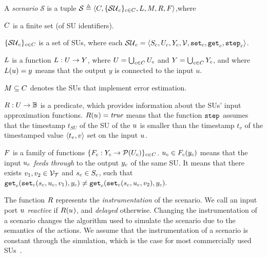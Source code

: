 \begin{definition}[Scenario]\label{def:cosim_scenario}
  A \emph{scenario} $\mathcal{S}$ is a tuple $\mathcal{S} \triangleq  \left\langle C, \{\mathcal{SU}_c\}_{c \in C}, L, M, R, F \right\rangle $,where 
  \begin{compactitem}
    \item $C$ is a finite set (of SU identifiers). 
    \item $\{\mathcal{SU}_c\}_{c \in C}$ is a set of SUs, where each $\mathcal{SU}_c =  \left\langle S_{c}, U_{c}, Y_{c}, \mathcal{V}, \mathtt{set}_{c}, \mathtt{get}_{c}, \mathtt{step}_{c} \right\rangle $.
    \item
    $L$ is a function $L : U \to Y$, where $U = \bigcup_{c \in C} U_{c}$ and $Y = \bigcup_{c \in C} Y_{c}$, and where 
    $L(u)=y$ means that the output $y$ is connected to the input $u$.   
    \item $M \subseteq C$ denotes the SUs that implement error estimation. 
    \item
    $R : U \to \mathbb{B}$ is a predicate, which provides information about the SUs' input approximation functions.
    $R(u_{}) = \mathit{true}$ means that the function $\mathtt{step}_{}$ assumes that the timestamp $t_{SU}$ of the SU of the $u_{}$ is smaller than the timestamp $t_v$ of the timestamped value $ \left\langle t_v,v \right\rangle $ set on the input $u_{}$.
    \item $F$ is a family of functions $\{F_{c} : Y_{c} \to \mathcal{P}(U_{c})\}_{c \in C}$.
    $u_{c} \in F_{c}(y_{c})$ means that the input $u_{c}$ \emph{feeds through} to the output $y_{c}$ of the same SU.
    It means that there exists $v_1, v_2 \in \mathcal{V_{T}}$ and $s_{c} \in S_{c}$, such that
    $\mathtt{get}_{c} (\mathtt{set}_{c}(s_{c}, u_{c}, v_1), y_{c}) \neq \mathtt{get}_{c} (\mathtt{set}_{c}(s_{c}, u_{c}, v_2), y_{c}).$
  \end{compactitem}
\end{definition}

The function $R$ represents the \emph{instrumentation} of the scenario.
We call an input port $u_{}$ \emph{reactive} if $R(u_{})$, and \emph{delayed} otherwise. 
Changing the instrumentation of a scenario changes the algorithm used to simulate the scenario due to the semantics of the actions.
We assume that the instrumentation of a scenario is constant through the simulation, which is the case for most commercially used SUs~\cite{Gomes2018a}.

